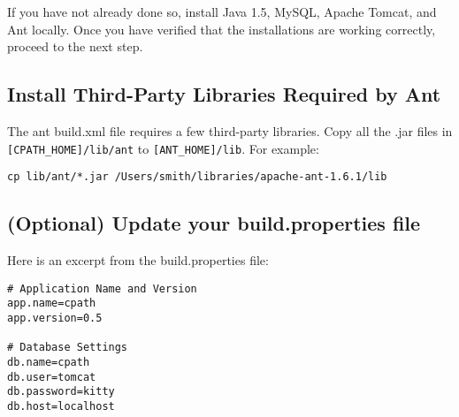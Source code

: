 \documentclass{article}
\begin{document}
If you have not already done so, install Java 1.5, MySQL, Apache Tomcat, and Ant locally. Once you have verified that the installations are working correctly, proceed to the next step. 

\subsection{Install Third-Party Libraries Required by Ant}

The ant build.xml file requires a few third-party libraries.  Copy all the .jar files in \verb+[CPATH_HOME]/lib/ant+ to 
\verb+[ANT_HOME]/lib+.  For example: 
 

\bigskip

\texttt{cp lib/ant/*.jar /Users/smith/libraries/apache-ant-1.6.1/lib}

\subsection{(Optional) Update your build.properties file}

Here is an excerpt from the build.properties file: 
 
\begin{verbatim}
# Application Name and Version 
app.name=cpath 
app.version=0.5 
 
# Database Settings 
db.name=cpath 
db.user=tomcat 
db.password=kitty 
db.host=localhost 
\end{verbatim}



\end{document}
